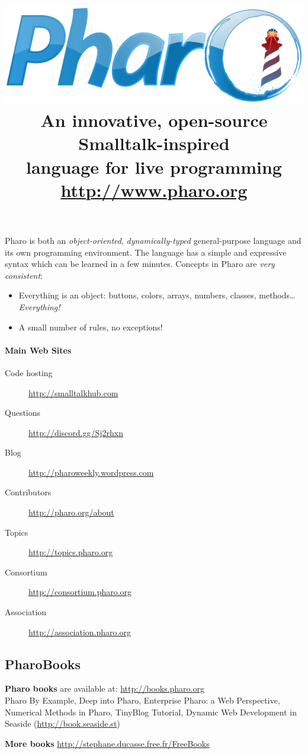 \documentclass[notumble]{leaflet}
\title{\vspace{-1.0cm}\normalfont
\includegraphics[width=0.8\linewidth]{logo.pdf}
\\[1.2\baselineskip]%
\vspace{-0.8cm}
\fontseries{cl}\selectfont\LARGE
An innovative, open-source Smalltalk-inspired \\ language for live programming\\
\url{http://www.pharo.org}}
\date{}
\begin{document}
\maketitle
\thispagestyle{empty}
\vspace{-1.7cm}
Pharo is both an \emph{object-oriented}, \emph{dynamically-typed}
general-purpose language and its own programming environment. The
language has a simple and expressive syntax which can be learned
in a few minutes. Concepts in Pharo are \emph{very consistent}:
\begin{itemize}
  \item Everything is an object: buttons, colors, arrays, numbers, classes, methods\ldots \emph{Everything!}
  \item A small number of rules, no exceptions!
\end{itemize}

\paragraph{Main Web Sites}
\begin{description}
 \item[Code hosting] \url{http://smalltalkhub.com}
 \item[Questions]    \url{http://discord.gg/Sj2rhxn}
 \item[Blog] \url{http://pharoweekly.wordpress.com}
 \item[Contributors] \url{http://pharo.org/about}
 \item[Topics]       \url{http://topics.pharo.org}
 \item[Consortium]   \url{http://consortium.pharo.org}
 \item[Association]  \url{http://association.pharo.org}
\end{description}

\subsection{PharoBooks}

\textbf{Pharo books} are available at: \url{http://books.pharo.org}\\
Pharo By Example, Deep into Pharo, Enterprise Pharo: a Web Perspective,
Numerical Methods in Pharo, TinyBlog Tutorial, Dynamic Web Development in Seaside 
(\url{http://book.seaside.st})

\textbf{More books} \url{http://stephane.ducasse.free.fr/FreeBooks}
\end{document}
